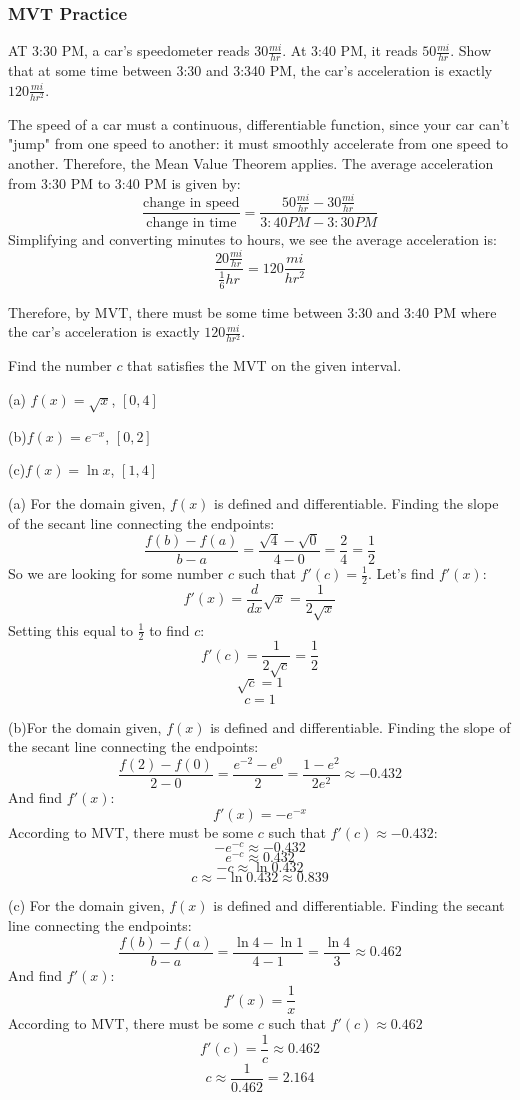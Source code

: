 \subsubsection{MVT Practice}
\begin{Exercise}
[label=MVT1]
AT 3:30 PM, a car's speedometer reads $30 \frac{mi}{hr}$. At 3:40 PM, it reads $50\frac{mi}{hr}$. Show that at some time between 3:30 and 3:340 PM, the car's acceleration is exactly $120 \frac{mi}{hr^2}$. 
\end{Exercise}
\begin{Answer}
[ref=MVT1]
The speed of a car must a continuous, differentiable function, since your car can't "jump" from one speed to another: it must smoothly accelerate from one speed to another. Therefore, the Mean Value Theorem applies. The average acceleration from 3:30 PM to 3:40 PM is given by:
$$\frac{\text{change in speed}}{\text{change in time}} = \frac{50 \frac{mi}{hr}-30\frac{mi}{hr}}{3:40PM-3:30PM}$$ 
Simplifying and converting minutes to hours, we see the average acceleration is:
$$\frac{20\frac{mi}{hr}}{\frac{1}{6}hr} = 120\frac{mi}{hr^2}$$

Therefore, by MVT, there must be some time between 3:30 and 3:40 PM where the car's acceleration is exactly $120 \frac{mi}{hr^2}$. 
\end{Answer}

\begin{Exercise}
[label=MVT2]
Find the number $c$ that satisfies the MVT on the given interval. 

(a) $f(x) = \sqrt{x}$, $[0, 4]$

(b)$f(x) = e^{-x}$, $[0,2]$

(c)$f(x) = \ln{x}$, $[1,4]$	
\end{Exercise}

\begin{Answer}
[ref=MVT2]
(a) For the domain given, $f(x)$ is defined and differentiable. Finding the slope of the secant line connecting the endpoints:
$$\frac{f(b)-f(a)}{b-a}=\frac{\sqrt{4}-\sqrt{0}}{4-0}=\frac{2}{4}=\frac{1}{2}$$
So we are looking for some number $c$ such that $f'(c) = \frac{1}{2}$. Let's find $f'(x)$:
$$f'(x) = \frac{d}{dx}\sqrt{x}=\frac{1}{2\sqrt{x}}$$
Setting this equal to $\frac{1}{2}$ to find $c$:
$$f'(c) = \frac{1}{2\sqrt{c}}=\frac{1}{2}$$
$$\sqrt{c}=1$$
$$c=1$$

(b)For the domain given, $f(x)$ is defined and differentiable. Finding the slope of the secant line connecting the endpoints:
$$\frac{f(2)-f(0)}{2-0}=\frac{e^{-2}-e^{0}}{2}=\frac{1-e^{2}}{2e^{2}}\approx -0.432$$
And find $f'(x)$:
$$f'(x) = -e^{-x}$$
According to MVT, there must be some $c$ such that $f'(c) \approx-0.432$:
$$-e^{-c} \approx -0.432$$
$$e^{-c}\approx 0.432$$
$$-c \approx \ln{0.432}$$
$$c \approx -\ln{0.432} \approx 0.839$$

(c) For the domain given, $f(x)$ is defined and differentiable. Finding the secant line connecting the endpoints:
$$\frac{f(b)-f(a)}{b-a}=\frac{\ln{4}-\ln{1}}{4-1}=\frac{\ln{4}}{3}\approx 0.462$$
And find $f'(x)$:
$$f'(x) = \frac{1}{x}$$
According to MVT, there must be some $c$ such that $f'(c) \approx 0.462$
$$f'(c) = \frac{1}{c} \approx 0.462$$
$$c \approx \frac{1}{0.462} = 2.164$$
\end{Answer}

